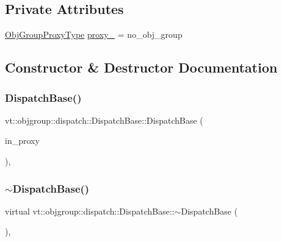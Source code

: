 \subsection*{Private Attributes}
\begin{DoxyCompactItemize}
\item 
\hyperlink{namespacevt_ad7cae989df485fccca57f0792a880a8e}{Obj\+Group\+Proxy\+Type} \hyperlink{structvt_1_1objgroup_1_1dispatch_1_1_dispatch_base_a4ae6b83696e76f6e7293e58262b608d5}{proxy\+\_\+} = no\+\_\+obj\+\_\+group
\end{DoxyCompactItemize}


\subsection{Constructor \& Destructor Documentation}
\mbox{\label{structvt_1_1objgroup_1_1dispatch_1_1_dispatch_base_ac6d83a669d4b1a30fbdc264de4d5bcb4}} 
\subsubsection{\texorpdfstring{Dispatch\+Base()}{DispatchBase()}}
{\footnotesize\ttfamily vt\+::objgroup\+::dispatch\+::\+Dispatch\+Base\+::\+Dispatch\+Base (\begin{DoxyParamCaption}\item[{\hyperlink{namespacevt_ad7cae989df485fccca57f0792a880a8e}{Obj\+Group\+Proxy\+Type}}]{in\+\_\+proxy }\end{DoxyParamCaption})\hspace{0.3cm}{\ttfamily [inline]}, {\ttfamily [explicit]}}

\mbox{\label{structvt_1_1objgroup_1_1dispatch_1_1_dispatch_base_ad3a30bcc1ed4d045c208818d10b6cf96}} 
\subsubsection{\texorpdfstring{$\sim$\+Dispatch\+Base()}{~DispatchBase()}}
{\footnotesize\ttfamily virtual vt\+::objgroup\+::dispatch\+::\+Dispatch\+Base\+::$\sim$\+Dispatch\+Base (\begin{DoxyParamCaption}{ }\end{DoxyParamCaption})\hspace{0.3cm}{\ttfamily [virtual]}, {\ttfamily [default]}}



